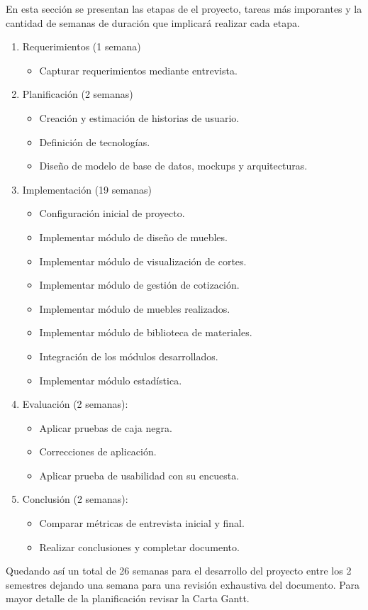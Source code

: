 \documentclass[12pt,oneside]{article}
\begin{document}
En esta sección se presentan las etapas de el proyecto, tareas más imporantes y la cantidad de semanas de duración que implicará realizar cada etapa.
\begin{enumerate}
\item Requerimientos (1 semana)
    \begin{itemize}
        \item Capturar requerimientos mediante entrevista.
    \end{itemize}

\item Planificación (2 semanas)
\begin{itemize}
    \item Creación y estimación de historias de usuario.
    \item Definición de tecnologías.
    \item Diseño de modelo de base de datos, mockups y arquitecturas.
\end{itemize}
    
\item Implementación (19 semanas)
\begin{itemize}
    \item Configuración inicial de proyecto.
    \item Implementar módulo de diseño de muebles.
    \item Implementar módulo de visualización de cortes.
    \item Implementar módulo de gestión de cotización.
    \item Implementar módulo de muebles realizados.
    \item Implementar módulo de biblioteca de materiales.
    \item Integración de los módulos desarrollados.
   \item  Implementar módulo estadística.
\end{itemize}

    
\item Evaluación (2 semanas):
\begin{itemize}
    \item Aplicar pruebas de caja negra.
    \item Correcciones de aplicación.
    \item Aplicar prueba de usabilidad con su encuesta.
\end{itemize}

 \item Conclusión (2 semanas):
 \begin{itemize}
    \item Comparar métricas de entrevista inicial y final.
    \item Realizar conclusiones y completar documento.
 \end{itemize}

\end{enumerate}
Quedando así un total de 26 semanas para el desarrollo del proyecto entre los 2 semestres dejando una semana para una revisión exhaustiva del documento. Para mayor detalle de la planificación revisar la Carta Gantt.
\end{document}
